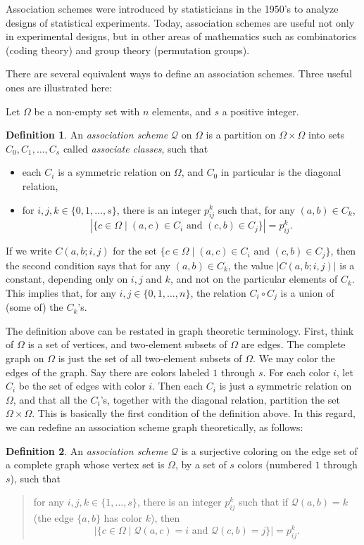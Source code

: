 \documentclass[12pt]{article}
\begin{document}
Association schemes were introduced by statisticians in the 1950's to analyze designs of statistical experiments.  Today, association schemes are useful not only in experimental designs, but in other areas of mathematics such as combinatorics (coding theory) and group theory (permutation groups).

There are several equivalent ways to define an association schemes.  Three useful ones are illustrated here:

Let $\Omega$ be a non-empty set with $n$ elements, and $s$ a positive integer.

\textbf{Definition 1}.  An \emph{association scheme} $\mathscr{Q}$ on $\Omega$ is a partition on $\Omega\times \Omega$ into sets $C_0,C_1,\ldots, C_s$ called \emph{associate classes}, such that
\begin{itemize}
\item each $C_i$ is a symmetric relation on $\Omega$, and $C_0$ in particular is the diagonal relation,
\item for $i,j,k\in \lbrace 0,1,\ldots,s\rbrace$, there is an integer $p_{ij}^k$ such that, for any $(a,b)\in C_k$, $$|\lbrace c \in \Omega \mid (a,c)\in C_i \mbox{ and } (c,b)\in C_j \rbrace|=p_{ij}^k.$$
\end{itemize}

If we write $C(a,b;i,j)$ for the set $\lbrace c \in \Omega \mid (a,c)\in C_i \mbox{ and } (c,b)\in C_j \rbrace$, then the second condition says that for any $(a,b)\in C_k$, the value $|C(a,b;i,j)|$ is a constant, depending only on $i,j$ and $k$, and not on the particular elements of $C_k$.  This implies that, for any $i,j\in \lbrace 0,1,\ldots, n\rbrace$, the relation $C_i\circ C_j$ is a union of (some of) the $C_k$'s.

The definition above can be restated in graph theoretic terminology.  First, think of $\Omega$ is a set of vertices, and two-element subsets of $\Omega$ are edges.  The complete graph on $\Omega$ is just the set of all two-element subsets of $\Omega$.  We may color the edges of the graph.  Say there are colors labeled $1$ through $s$.  For each color $i$, let $C_i$ be the set of edges with color $i$.  Then each $C_i$ is just a symmetric relation on $\Omega$, and that all the $C_i$'s, together with the diagonal relation, partition the set $\Omega\times\Omega$.  This is basically the first condition of the definition above.  In this regard, we can redefine an association scheme graph theoretically, as follows:

\textbf{Definition 2}.  An \emph{association scheme} $\mathscr{Q}$ is a surjective coloring on the edge set of a complete graph whose vertex set is $\Omega$, by a set of $s$ colors (numbered $1$ through $s$), such that
\begin{quote}
for any $i,j,k\in \lbrace 1,\ldots,s\rbrace$, there is an integer $p_{ij}^k$ such that if $\mathscr{Q}(a,b)=k$ (the edge $\lbrace a,b\rbrace$ has color $k$), then 
$$|\lbrace c \in \Omega \mid \mathscr{Q}(a,c)=i \mbox{ and } \mathscr{Q}(c,b)=j \rbrace|=p_{ij}^k.$$
\end{quote}
\end{document}
